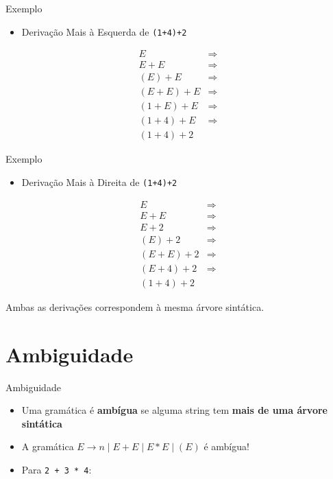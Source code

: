 \begin{frame}[fragile]{Exemplo}

    \begin{itemize}

        \item
        Derivação Mais à Esquerda de \texttt{(1+4)+2}
    \end{itemize}

    \[\begin{array}{lc}
    E     & \Rightarrow \\
    E + E & \Rightarrow \\
    (E) + E & \Rightarrow \\
    (E + E) + E & \Rightarrow \\
    (1 + E) + E & \Rightarrow \\
    (1 + 4) + E & \Rightarrow \\
    (1 + 4) + 2
\end{array}\]
\end{frame}

\begin{frame}[fragile]{Exemplo}

    \begin{itemize}

        \item
        Derivação Mais à Direita de \texttt{(1+4)+2}
    \end{itemize}

    \[\begin{array}{lc}
    E     & \Rightarrow \\
    E + E & \Rightarrow \\
    E + 2 & \Rightarrow \\
    (E) + 2 & \Rightarrow \\
    (E + E) + 2 & \Rightarrow \\
    (E + 4) + 2 & \Rightarrow \\
    (1 + 4) + 2
\end{array}\]

Ambas as derivações correspondem à mesma árvore sintática.
\end{frame}


\section{Ambiguidade}\label{ambiguidade}

\begin{frame}[fragile]{Ambiguidade}

    \begin{itemize}

        \item
        Uma gramática é \textbf{ambígua} se alguma string tem \textbf{mais de
        uma árvore sintática}
        \item
        A gramática \(E \to n \mid E+E \mid E*E \mid (E)\) é ambígua!
        \item
        Para \texttt{2 + 3 * 4}:
    \end{itemize}
\end{frame}


